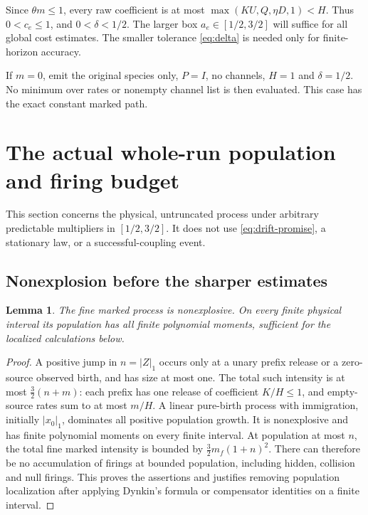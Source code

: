 \documentclass[11pt,reqno]{amsart}
\newtheorem{lemma}[theorem]{Lemma}
\theoremstyle{definition}
\theoremstyle{remark}
\begin{document}
Since $\theta m\le1$, every raw coefficient is at most
$\max(KU,Q,\eta D,1)<H$. Thus $0<c_e\le1$, and
$0<\delta<1/2$. The larger box $a_e\in[1/2,3/2]$ will suffice for all global
cost estimates. The smaller tolerance \eqref{eq:delta} is needed only for
finite-horizon accuracy.

If $m=0$, emit the original species only, $P=I$, no channels, $H=1$ and
$\delta=1/2$. No minimum over rates or nonempty channel list is then evaluated.
This case has the exact constant marked path.

\section{The actual whole-run population and firing budget}\label{sec:global}
This section concerns the physical, untruncated process under arbitrary
predictable multipliers in $[1/2,3/2]$. It does not use
\eqref{eq:drift-promise}, a stationary law, or a successful-coupling event.

\subsection{Nonexplosion before the sharper estimates}
\begin{lemma}\label{lem:fine-nonexplosion}
The fine marked process is nonexplosive. On every finite physical interval its
population has all finite polynomial moments, sufficient for the localized
calculations below.
\end{lemma}
\begin{proof}
A positive jump in $n=|Z|_1$ occurs only at a unary prefix release or a
zero-source observed birth, and has size at most one. The total such intensity
is at most $\tfrac32(n+m)$: each prefix has one release of coefficient
$K/H\le1$, and empty-source rates sum to at most $m/H$. A linear pure-birth
process with immigration, initially $|x_0|_1$, dominates all positive population
growth. It is nonexplosive and has finite polynomial moments on every finite
interval. At population at most $n$, the total fine marked intensity is bounded
by $\tfrac32m_f(1+n)^2$. There can therefore be no accumulation of firings at
bounded population, including hidden, collision and null firings. This proves
the assertions and justifies removing population localization after applying
Dynkin's formula or compensator identities on a finite interval.
\end{proof}
\end{document}
